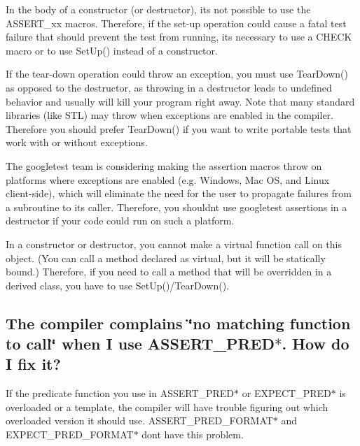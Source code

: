 \begin{DoxyItemize}
\item In the body of a constructor (or destructor), it\textquotesingle{}s not possible to use the {\ttfamily A\+S\+S\+E\+R\+T\+\_\+xx} macros. Therefore, if the set-\/up operation could cause a fatal test failure that should prevent the test from running, it\textquotesingle{}s necessary to use a {\ttfamily C\+H\+E\+CK} macro or to use {\ttfamily Set\+Up()} instead of a constructor.
\item If the tear-\/down operation could throw an exception, you must use {\ttfamily Tear\+Down()} as opposed to the destructor, as throwing in a destructor leads to undefined behavior and usually will kill your program right away. Note that many standard libraries (like S\+TL) may throw when exceptions are enabled in the compiler. Therefore you should prefer {\ttfamily Tear\+Down()} if you want to write portable tests that work with or without exceptions.
\item The googletest team is considering making the assertion macros throw on platforms where exceptions are enabled (e.\+g. Windows, Mac OS, and Linux client-\/side), which will eliminate the need for the user to propagate failures from a subroutine to its caller. Therefore, you shouldn\textquotesingle{}t use googletest assertions in a destructor if your code could run on such a platform.
\item In a constructor or destructor, you cannot make a virtual function call on this object. (You can call a method declared as virtual, but it will be statically bound.) Therefore, if you need to call a method that will be overridden in a derived class, you have to use {\ttfamily Set\+Up()/\+Tear\+Down()}.
\end{DoxyItemize}

\subsection*{The compiler complains \char`\"{}no matching function to call\char`\"{} when I use A\+S\+S\+E\+R\+T\+\_\+\+P\+R\+E\+D$\ast$. How do I fix it?}

If the predicate function you use in {\ttfamily A\+S\+S\+E\+R\+T\+\_\+\+P\+R\+E\+D$\ast$} or {\ttfamily E\+X\+P\+E\+C\+T\+\_\+\+P\+R\+E\+D$\ast$} is overloaded or a template, the compiler will have trouble figuring out which overloaded version it should use. {\ttfamily A\+S\+S\+E\+R\+T\+\_\+\+P\+R\+E\+D\+\_\+\+F\+O\+R\+M\+A\+T$\ast$} and {\ttfamily E\+X\+P\+E\+C\+T\+\_\+\+P\+R\+E\+D\+\_\+\+F\+O\+R\+M\+A\+T$\ast$} don\textquotesingle{}t have this problem.


